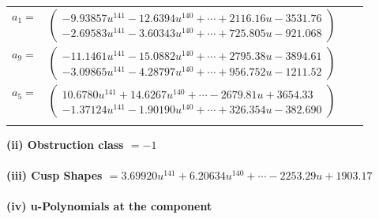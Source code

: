 \documentclass[1p]{elsarticle_modified}
\theoremstyle{definition}
\begin{document}
\begin{tabular}{m{7pt} m{180pt} m{7pt} m{180pt} }
\flushright $a_{1}=$&$\begin{pmatrix}-9.93857 u^{141}-12.6394 u^{140}+\cdots+2116.16 u-3531.76\\-2.69583 u^{141}-3.60343 u^{140}+\cdots+725.805 u-921.068\end{pmatrix}$ \\
\flushright $a_{9}=$&$\begin{pmatrix}-11.1461 u^{141}-15.0882 u^{140}+\cdots+2795.38 u-3894.61\\-3.09865 u^{141}-4.28797 u^{140}+\cdots+956.752 u-1211.52\end{pmatrix}$ \\
\flushright $a_{5}=$&$\begin{pmatrix}10.6780 u^{141}+14.6267 u^{140}+\cdots-2679.81 u+3654.33\\-1.37124 u^{141}-1.90190 u^{140}+\cdots+326.354 u-382.690\end{pmatrix}$\\&\end{tabular}
\flushleft \textbf{(ii) Obstruction class $= -1$}\\~\\
\flushleft \textbf{(iii) Cusp Shapes $= 3.69920 u^{141}+6.20634 u^{140}+\cdots-2253.29 u+1903.17$}\\~\\
\newpage\renewcommand{\arraystretch}{1}
\flushleft \textbf{(iv) u-Polynomials at the component}\newline \\
\end{document}
